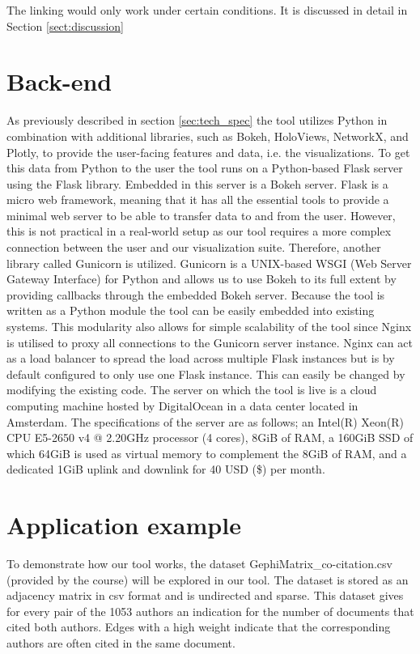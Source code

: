 \documentclass[journal]{vgtc}                %
\begin{document}
The linking would only work under certain conditions. It is discussed in detail in Section \ref{sect:discussion}

\section{Back-end} %
As previously described in section \ref{sec:tech_spec} the tool utilizes Python in combination with additional libraries, such as Bokeh, HoloViews, NetworkX, and Plotly, to provide the user-facing features and data, i.e. the visualizations. To get this data from Python to the user the tool runs on a Python-based Flask server using the Flask library. Embedded in this server is a Bokeh server. Flask is a micro web framework, meaning that it has all the essential tools to provide a minimal web server to be able to transfer data to and from the user. However, this is not practical in a real-world setup as our tool requires a more complex connection between the user and our visualization suite. Therefore, another library called Gunicorn is utilized. Gunicorn is a UNIX-based WSGI (Web Server Gateway Interface) for Python and allows us to use Bokeh to its full extent by providing callbacks through the embedded Bokeh server.
Because the tool is written as a Python module the tool can be easily embedded into existing systems. This modularity also allows for simple scalability of the tool since Nginx is utilised to proxy all connections to the Gunicorn server instance. Nginx can act as a load balancer to spread the load across multiple Flask instances but is by default configured to only use one Flask instance. This can easily be changed by modifying the existing code.
The server on which the tool is live is a cloud computing machine hosted by DigitalOcean in a data center located in Amsterdam. The specifications of the server are as follows; an Intel(R) Xeon(R) CPU E5-2650 v4 @ 2.20GHz processor (4 cores), 8GiB of RAM, a 160GiB SSD of which 64GiB is used as virtual memory to complement the 8GiB of RAM, and a dedicated 1GiB uplink and downlink for 40 USD (\$) per month.

\section{Application example} %
To demonstrate how our tool works, the dataset GephiMatrix\_co-citation.csv (provided by the course) will be explored in our tool. The dataset is stored as an adjacency matrix in csv format and is undirected and sparse. This dataset gives for every pair of the 1053 authors an indication for the number of documents that cited both authors. Edges with a high weight indicate that the corresponding authors are often cited in the same document.
\end{document}
